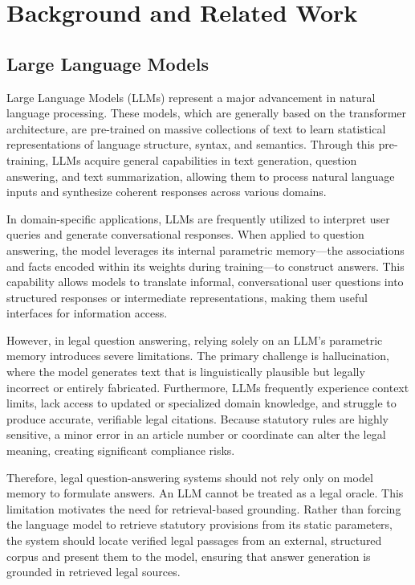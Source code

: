 \chapter{Background and Related Work}

\section{Large Language Models}
Large Language Models (LLMs) represent a major advancement in natural language processing. These models, which are generally based on the transformer architecture, are pre-trained on massive collections of text to learn statistical representations of language structure, syntax, and semantics. Through this pre-training, LLMs acquire general capabilities in text generation, question answering, and text summarization, allowing them to process natural language inputs and synthesize coherent responses across various domains.

In domain-specific applications, LLMs are frequently utilized to interpret user queries and generate conversational responses. When applied to question answering, the model leverages its internal parametric memory—the associations and facts encoded within its weights during training—to construct answers. This capability allows models to translate informal, conversational user questions into structured responses or intermediate representations, making them useful interfaces for information access.

However, in legal question answering, relying solely on an LLM's parametric memory introduces severe limitations. The primary challenge is hallucination, where the model generates text that is linguistically plausible but legally incorrect or entirely fabricated. Furthermore, LLMs frequently experience context limits, lack access to updated or specialized domain knowledge, and struggle to produce accurate, verifiable legal citations. Because statutory rules are highly sensitive, a minor error in an article number or coordinate can alter the legal meaning, creating significant compliance risks.

Therefore, legal question-answering systems should not rely only on model memory to formulate answers. An LLM cannot be treated as a legal oracle. This limitation motivates the need for retrieval-based grounding. Rather than forcing the language model to retrieve statutory provisions from its static parameters, the system should locate verified legal passages from an external, structured corpus and present them to the model, ensuring that answer generation is grounded in retrieved legal sources.

